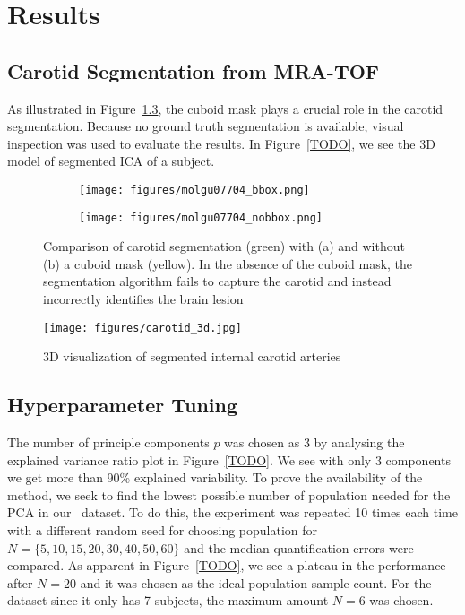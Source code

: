 \chapter{Results}
\section{Carotid Segmentation from MRA-TOF}
As illustrated in Figure~\ref{fig:seg_compare}, the cuboid mask plays a crucial role in the carotid segmentation.
Because no ground truth segmentation is available, visual inspection was used to evaluate the results.
In Figure~\ref{TODO}, we see the 3D model of segmented ICA of a subject.
\begin{figure}[h]
	\centering
	\begin{subfigure}{0.45\textwidth}
		\texttt{[image: figures/molgu07704\_bbox.png]}
		\caption{}
		\label{subfig:seg_bbox}
	\end{subfigure}
	\begin{subfigure}{0.45\textwidth}
		\texttt{[image: figures/molgu07704\_nobbox.png]}
		\caption{}
		\label{subfig:seg_nobbox}
	\end{subfigure}
	\caption{Comparison of carotid segmentation (green) with (a) and without (b) a cuboid mask (yellow). In the absence of the cuboid mask, the segmentation algorithm fails to capture the carotid and instead incorrectly identifies the brain lesion}
	\label{fig:seg_compare}
\end{figure}

\begin{figure}[t]
	\centering
	\texttt{[image: figures/carotid\_3d.jpg]}
	\caption{3D visualization of segmented internal carotid arteries}
\end{figure}

\section{Hyperparameter Tuning}
The number of principle components $p$ was chosen as 3 by analysing the explained variance ratio plot in Figure~\ref{TODO}.
We see with only 3 components we get more than 90\% explained variability.
To prove the availability of the method, we seek to find the lowest possible number of population needed for the PCA in our \fdg $\,$ dataset.
To do this, the experiment was repeated 10 times each time with a different random seed for choosing population for $N=\{5,10,15,20,30,40,50,60\}$ and the median quantification errors were compared.
As apparent in Figure~\ref{TODO}, we see a plateau in the performance after $N=20$ and it was chosen as the ideal population sample count.
For the \yohimbine$\,$ dataset since it only has 7 subjects, the maximum amount $N=6$ was chosen.


